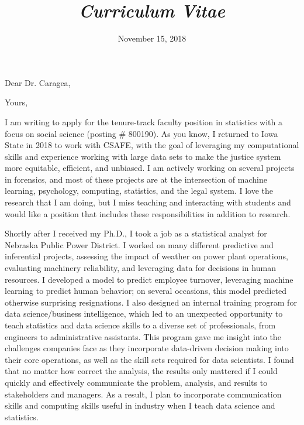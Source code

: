 \documentclass[12pt, letterpaper, sans]{moderncv}
\title{\emph{Curriculum Vitae}}
\begin{document}
\date{November 15, 2018}
\opening{Dear Dr. Caragea,}
\closing{Yours,}
\makelettertitle

I am writing to apply for the tenure-track faculty position in statistics with a focus on social science (posting \# 800190). As you know, I returned to Iowa State in 2018 to work with CSAFE, with the goal of leveraging my computational skills and experience working with large data sets to make the justice system more equitable, efficient, and unbiased. I am actively working on several projects in forensics, and most of these projects are at the intersection of machine learning, psychology, computing, statistics, and the legal system. I love the research that I am doing, but I miss teaching and interacting with students and would like a position that includes these responsibilities in addition to research. 

Shortly after I received my Ph.D., I took a job as a statistical analyst for Nebraska Public Power District. I worked on many different predictive and inferential projects, assessing the impact of weather on power plant operations, evaluating machinery reliability, and leveraging data for decisions in human resources. I developed a model to predict employee turnover, leveraging machine learning to predict human behavior; on several occasions, this model predicted otherwise surprising resignations. I also designed an internal training program for data science/business intelligence, which led to an unexpected opportunity to teach statistics and data science skills to a diverse set of professionals, from engineers to administrative assistants. This program gave me insight into the challenges companies face as they incorporate data-driven decision making into their core operations, as well as the skill sets required for data scientists. I found that no matter how correct the analysis, the results only mattered if I could quickly and effectively communicate the problem, analysis, and results to stakeholders and managers. As a result, I plan to incorporate communication skills and computing skills useful in industry when I teach data science and statistics. 
\end{document}
